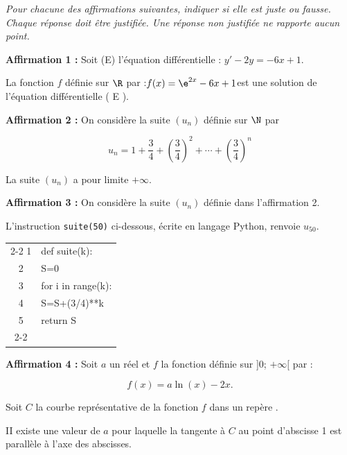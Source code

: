 \emph{Pour chacune des affirmations suivantes, indiquer si elle est juste ou fausse. Chaque réponse doit être justifiée. Une réponse non justifiée ne rapporte aucun point.}

\medskip

\textbf{Affirmation 1 :} Soit (E) l'équation différentielle : $y'- 2 y= - 6 x + 1$.

La fonction $f$ définie sur $\R$ par :\quad $f(x)=\e^{2 x}-6 x + 1$\quad est une solution de l'équation différentielle ( E ).

\medskip

\textbf{Affirmation 2 :} On considère la suite $\left(u_{n}\right)$ définie sur $\N$ par

\[ u_{n}=1 + \dfrac{3}{4} + \left(\dfrac{3}{4}\right)^{2} + \cdots + \left(\dfrac{3}{4}\right)^{n}	\]

La suite $\left(u_{n}\right)$ a pour limite $ + \infty$.

\medskip

\textbf{Affirmation 3 :} On considère la suite $\left(u_{n}\right)$ définie dans l'affirmation 2.

L'instruction \texttt{suite(50)} ci-dessous, écrite en langage Python, renvoie $u_{50}$.

\begin{center}
	\begin{ttfamily}
	\begin{tabularx}{8cm}{c|X|}\cline{2-2}
		1&def suite(k):\\
		2&\quad S=0\\
		3&\quad for i in range(k):\\
		4&\qquad S=S+(3/4)**k\\
		5&\quad return S\\ \cline{2-2}
	\end{tabularx}
\end{ttfamily}
\end{center}

\medskip

\textbf{Affirmation 4 :} Soit $a$ un réel et $f$ la fonction définie sur ]0; $ + \infty[$ par :

\[f(x) = a \ln (x) - 2x.\]

Soit $C$ la courbe représentative de la fonction $f$ dans un repère \Oij.

II existe une valeur de $a$ pour laquelle la tangente à $C$ au point d'abscisse 1 est parallèle à l'axe des abscisses.
